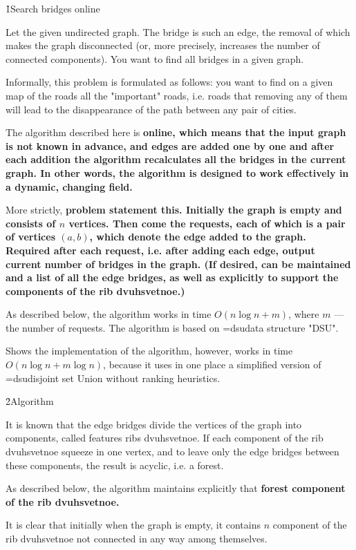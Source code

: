 \h1{Search bridges online}

Let the given undirected graph. The bridge is such an edge, the removal of which makes the graph disconnected (or, more precisely, increases the number of connected components). You want to find all bridges in a given graph.

Informally, this problem is formulated as follows: you want to find on a given map of the roads all the "important" roads, i.e. roads that removing any of them will lead to the disappearance of the path between any pair of cities.

The algorithm described here is \bf{online}, which means that the input graph is not known in advance, and edges are added one by one and after each addition the algorithm recalculates all the bridges in the current graph. In other words, the algorithm is designed to work effectively in a dynamic, changing field.

More strictly, \bf{problem statement} this. Initially the graph is empty and consists of $n$ vertices. Then come the requests, each of which is a pair of vertices $(a,b)$, which denote the edge added to the graph. Required after each request, i.e. after adding each edge, output current number of bridges in the graph. (If desired, can be maintained and a list of all the edge bridges, as well as explicitly to support the components of the rib dvuhsvetnoe.)

As described below, the algorithm works in time $O (n \log n + m)$, where $m$ --- the number of requests. The algorithm is based on \algohref=dsu{data structure "DSU"}.

Shows the implementation of the algorithm, however, works in time $O (n \log n + m \log n)$, because it uses in one place a simplified version of \algohref=dsu{disjoint set Union} without ranking heuristics.


\h2{Algorithm}

It is known that the edge bridges divide the vertices of the graph into components, called features ribs dvuhsvetnoe. If each component of the rib dvuhsvetnoe squeeze in one vertex, and to leave only the edge bridges between these components, the result is acyclic, i.e. a forest.

As described below, the algorithm maintains explicitly that \bf{forest component of the rib dvuhsvetnoe}.

It is clear that initially when the graph is empty, it contains $n$ component of the rib dvuhsvetnoe not connected in any way among themselves.

